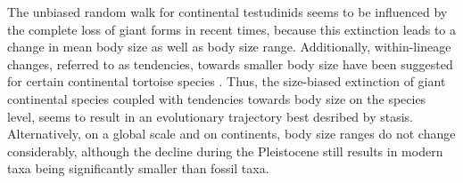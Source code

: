 The unbiased random walk for continental testudinids seems to be influenced by the complete loss of giant forms in recent times, because this extinction leads to a change in mean body size as well as body size range.
Additionally, within-lineage changes, referred to as tendencies, towards smaller body size have been suggested for certain continental tortoise species \citep{Klein2000,Steele2005,Franz2005,Speth2002}.
Thus, the size-biased extinction of giant continental species coupled with tendencies towards body size on the species level, seems to result in an evolutionary trajectory best desribed by stasis.
Alternatively, on a global scale and on continents, body size ranges do not change considerably, although the decline during the Pleistocene still results in modern taxa being significantly smaller than fossil taxa.


 




